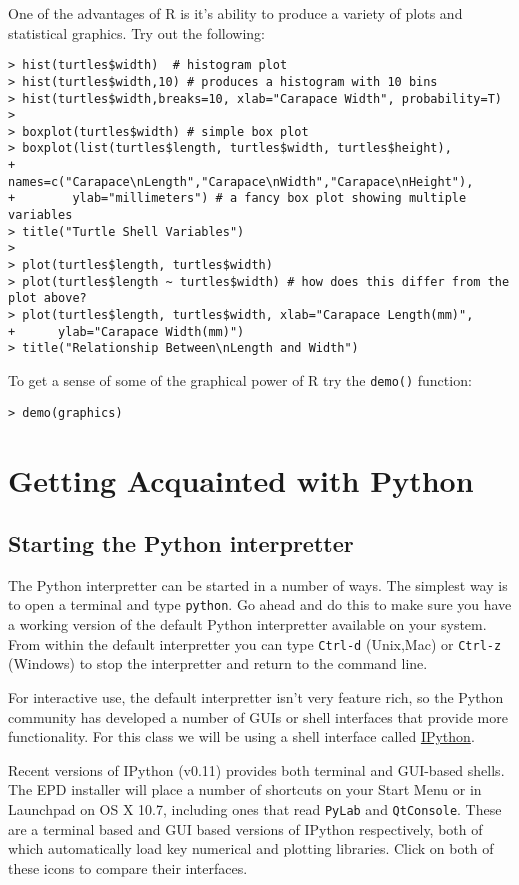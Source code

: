 \documentclass{article}
\begin{document}
One of the advantages of R is it's ability to produce a variety of plots
and statistical graphics. Try out the following:

\begin{lstlisting}
> hist(turtles$width)  # histogram plot
> hist(turtles$width,10) # produces a histogram with 10 bins
> hist(turtles$width,breaks=10, xlab="Carapace Width", probability=T)
>
> boxplot(turtles$width) # simple box plot
> boxplot(list(turtles$length, turtles$width, turtles$height),
+        names=c("Carapace\nLength","Carapace\nWidth","Carapace\nHeight"),
+        ylab="millimeters") # a fancy box plot showing multiple variables
> title("Turtle Shell Variables")
>
> plot(turtles$length, turtles$width)
> plot(turtles$length ~ turtles$width) # how does this differ from the plot above?
> plot(turtles$length, turtles$width, xlab="Carapace Length(mm)",
+      ylab="Carapace Width(mm)")
> title("Relationship Between\nLength and Width")
\end{lstlisting}
To get a sense of some of the graphical power of R try the
\lstinline!demo()! function:

\begin{lstlisting}
> demo(graphics)
\end{lstlisting}
\section{Getting Acquainted with Python}

\subsection{Starting the Python interpretter}

The Python interpretter can be started in a number of ways. The simplest
way is to open a terminal and type \lstinline!python!. Go ahead and do
this to make sure you have a working version of the default Python
interpretter available on your system. From within the default
interpretter you can type \lstinline!Ctrl-d! (Unix,Mac) or
\lstinline!Ctrl-z! (Windows) to stop the interpretter and return to the
command line.

For interactive use, the default interpretter isn't very feature rich,
so the Python community has developed a number of GUIs or shell
interfaces that provide more functionality. For this class we will be
using a shell interface called \href{http://ipython.org/}{IPython}.

Recent versions of IPython (v0.11) provides both terminal and GUI-based
shells. The EPD installer will place a number of shortcuts on your Start
Menu or in Launchpad on OS X 10.7, including ones that read
\lstinline!PyLab! and \lstinline!QtConsole!. These are a terminal based
and GUI based versions of IPython respectively, both of which
automatically load key numerical and plotting libraries. Click on both
of these icons to compare their interfaces.
\end{document}
